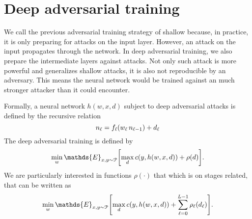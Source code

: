 \documentclass[11pt,letterpaper,DIV=17]{scrartcl}
\renewcommand{\eE}{\mathds{E}}
\renewcommand{\eE}{\mathds{E}}
\renewcommand{\l}[1][]{_{\ell#1}}
\renewcommand{\c}{c\qty}
\newcommand{\f}{f\l\qty}
\begin{document}
\section{Deep adversarial training}

We call the previous adversarial training strategy of shallow because, in practice, it is only preparing for attacks on the input layer. However, an attack on the input propagates through the network. In deep adversarial training, we also prepare the intermediate layers against attacks. Not only such attack is more powerful and generalizes shallow attacks, it is also not reproducible by an adversary. This means the neural network would be trained against an much stronger attacker than it could encounter.

Formally, a neural network $h(w,x,d)$ subject to deep adversarial attacks is defined by the recursive relation
\begin{equation} \label{eq:advneuron}
n\l=\f(w\l\,n\l[-1])+d\l
\end{equation}
The deep adversarial training is defined by
\begin{equation} \label{eq:deep1}
\min_{w} \eE_{x,y\sim\Pcal}\qty[\max_{d}\c(y,h(w,x,d))+\rho(d)].
\end{equation}
We are particularly interested in functions $\rho(\cdot)$ that which is on stages related, \ie that can be written as
\begin{equation} \label{eq:deep2}
\min_{w} \eE_{x,y\sim\Pcal}\qty[\max_{d}\c(y,h(w,x,d))+\sum_{\ell=0}^{L-1}\rho\l(d\l)].
\end{equation}
\end{document}
